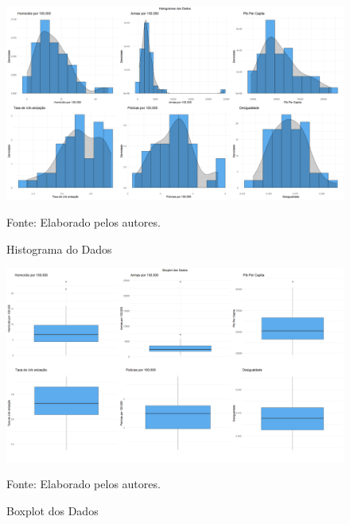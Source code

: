 \documentclass[12pt]{article}
\begin{document}
 \begin{figure}[H]
    \centering
    \caption{Histograma do Dados} 
    \includegraphics[width=1.0\textwidth]{Histograma do Dados.png}
    \label{fig:Histograma do Dados}
    
    \footnotesize{Fonte: Elaborado pelos autores.}
    \end{figure}

\begin{figure}[H]
    \centering
    \caption{Boxplot dos Dados}
    \includegraphics[width=1.0\textwidth]{Boxplot dos Dados.png}
    \label{fig:Boxplot dos Dados}
    
    \footnotesize{Fonte: Elaborado pelos autores.}
\end{figure}
\end{document}
